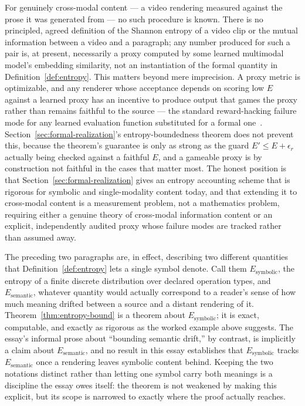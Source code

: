 \documentclass[11pt]{article}
\theoremstyle{definition}
\begin{document}
For genuinely cross-modal content --- a video rendering measured against the prose it was generated from --- no such procedure is known. There is no principled, agreed definition of the Shannon entropy of a video clip or the mutual information between a video and a paragraph; any number produced for such a pair is, at present, necessarily a proxy computed by some learned multimodal model's embedding similarity, not an instantiation of the formal quantity in Definition~\ref{def:entropy}. This matters beyond mere imprecision. A proxy metric is optimizable, and any renderer whose acceptance depends on scoring low $E$ against a learned proxy has an incentive to produce output that games the proxy rather than remains faithful to the source --- the standard reward-hacking failure mode for any learned evaluation function substituted for a formal one~\cite{amodei2016}. Section~\ref{sec:formal-realization}'s entropy-boundedness theorem does not prevent this, because the theorem's guarantee is only as strong as the guard $E' \leq E + \epsilon_r$ actually being checked against a faithful $E$, and a gameable proxy is by construction not faithful in the cases that matter most. The honest position is that Section~\ref{sec:formal-realization} gives an entropy accounting scheme that is rigorous for symbolic and single-modality content today, and that extending it to cross-modal content is a measurement problem, not a mathematics problem, requiring either a genuine theory of cross-modal information content or an explicit, independently audited proxy whose failure modes are tracked rather than assumed away.

The preceding two paragraphs are, in effect, describing two different quantities that Definition~\ref{def:entropy} lets a single symbol denote. Call them $E_{\mathrm{symbolic}}$, the entropy of a finite discrete distribution over declared operation types, and $E_{\mathrm{semantic}}$, whatever quantity would actually correspond to a reader's sense of how much meaning drifted between a source and a distant rendering of it. Theorem~\ref{thm:entropy-bound} is a theorem about $E_{\mathrm{symbolic}}$; it is exact, computable, and exactly as rigorous as the worked example above suggests. The essay's informal prose about ``bounding semantic drift,'' by contrast, is implicitly a claim about $E_{\mathrm{semantic}}$, and no result in this essay establishes that $E_{\mathrm{symbolic}}$ tracks $E_{\mathrm{semantic}}$ once a rendering leaves symbolic content behind. Keeping the two notations distinct rather than letting one symbol carry both meanings is a discipline the essay owes itself: the theorem is not weakened by making this explicit, but its scope is narrowed to exactly where the proof actually reaches.
\end{document}

